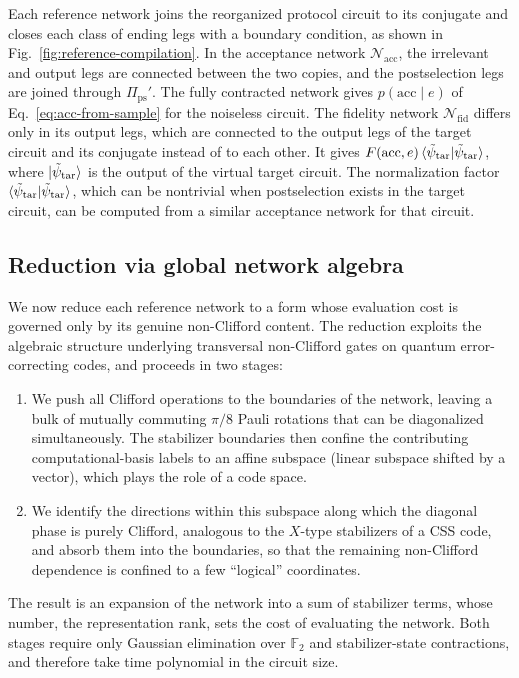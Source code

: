 \documentclass[aps,prx,twocolumn,superscriptaddress,longbibliography]{revtex4-2}
\newcommand{\F}{\mathbb F_2}
\begin{document}
Each reference network joins the reorganized protocol circuit to its conjugate
and closes each class of ending legs with a boundary condition,
as shown in Fig.~\ref{fig:reference-compilation}.
In the acceptance network $\mathcal{N}_{\text{acc}}$,
the irrelevant and output legs are connected between the two copies,
and the postselection legs are joined through $\Pi_{\text{ps}}'$.
The fully contracted network gives $p(\text{acc}\mid e)$ of Eq.~\eqref{eq:acc-from-sample} for the noiseless circuit.
The fidelity network $\mathcal{N}_{\text{fid}}$ differs only in its output legs,
which are connected to the output legs of the target circuit and its conjugate instead of to each other.
It gives $F(\text{acc},e)\braket{\tilde\psi_{\text{tar}}|\tilde\psi_{\text{tar}}}$,
where $\ket{\tilde\psi_{\text{tar}}}$ is the output of the virtual target circuit.
The normalization factor $\braket{\tilde\psi_{\text{tar}}|\tilde\psi_{\text{tar}}}$,
which can be nontrivial when postselection exists in the target circuit,
can be computed from a similar acceptance network for that circuit.


\subsection{Reduction via global network algebra}\label{sec:global-reduction}

We now reduce each reference network to a form 
whose evaluation cost is governed only by its genuine non-Clifford content. 
The reduction exploits the algebraic structure underlying transversal non-Clifford gates 
on quantum error-correcting codes, and proceeds in two stages:
\begin{enumerate}
    \item We push all Clifford operations to the boundaries of the network, 
    leaving a bulk of mutually commuting $\pi/8$ Pauli rotations that can be diagonalized simultaneously. 
    The stabilizer boundaries then confine the contributing computational-basis labels 
    to an affine subspace (linear subspace shifted by a vector), which plays the role of a code space. 
    \item We identify the directions within this subspace along which the diagonal phase is purely Clifford, 
    analogous to the $X$-type stabilizers of a CSS code, and absorb them into the boundaries, 
    so that the remaining non-Clifford dependence is confined to a few ``logical'' coordinates. 
\end{enumerate}
The result is an expansion of the network into a sum of stabilizer terms, 
whose number, the representation rank, sets the cost of evaluating the network. 
Both stages require only Gaussian elimination over $\F$ and stabilizer-state contractions, 
and therefore take time polynomial in the circuit size.
\end{document}
